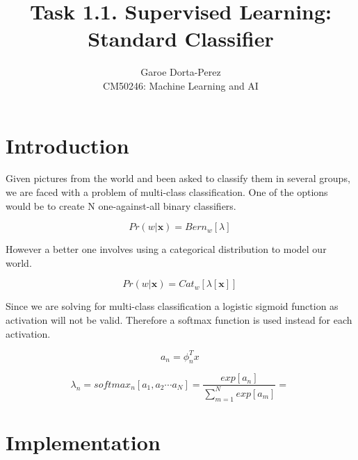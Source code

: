 \documentclass[12pt]{article}
\begin{document}
  
\title{Task 1.1. Supervised Learning: Standard Classifier}
\author{Garoe Dorta-Perez\\
CM50246: Machine Learning and AI}
 
\maketitle
 
\section{Introduction}
 
Given pictures from the world and been asked to classify them in several groups, we are faced with a problem of multi-class classification.
One of the options would be to create N one-against-all binary classifiers.

\begin{equation}
\label{bernoulliDistribution}
Pr(w|\mathbf{x}) = Bern_{w}[\lambda]\,
\end{equation}

However a better one involves using a categorical distribution to model our world.

\begin{equation}
\label{categoricalDistribution}
Pr(w|\mathbf{x}) = Cat_{w}[\lambda[\mathbf{x}]]\,
\end{equation}

Since we are solving for multi-class classification a logistic sigmoid function as activation will not be valid.
Therefore a softmax function is used instead for each activation.

\begin{equation}
\label{activations}
a_{n} = \phi_{n}^{T}x\,
\end{equation}

\begin{equation}
\label{softmax}
\lambda_{n} = softmax_{n}[a_{1}, a_{2} \cdots a_{N}] = 
\frac{exp[a_{n}]} {\sum_{m = 1}^{N} exp[a_{m}] }= \,
\end{equation}

 
\section{Implementation}

 
\end{document}
